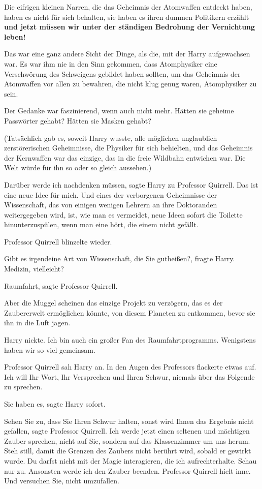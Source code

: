 Die eifrigen kleinen Narren, die das Geheimnis der Atomwaffen entdeckt haben,
haben es nicht für sich behalten, sie haben es ihren dummen Politikern erzählt
\textbf{und jetzt müssen wir unter der ständigen Bedrohung der Vernichtung
leben!}\grqq{}

Das war eine ganz andere Sicht der Dinge, als die, mit der Harry aufgewachsen
war. Es war ihm nie in den Sinn gekommen, dass Atomphysiker eine Verschwörung
des Schweigens gebildet haben sollten, um das Geheimnis der Atomwaffen vor allen
zu bewahren, die nicht klug genug waren, Atomphysiker zu sein.

Der Gedanke war faszinierend, wenn auch nicht mehr. Hätten sie geheime
Passwörter gehabt? Hätten sie Masken gehabt?

(Tatsächlich gab es, soweit Harry wusste, alle möglichen unglaublich
zerstörerischen Geheimnisse, die Physiker für sich behielten, und das Geheimnis
der Kernwaffen war das einzige, das in die freie Wildbahn entwichen war. Die
Welt würde für ihn so oder so gleich aussehen.)

\glqq{}Darüber werde ich nachdenken müssen\grqq{}, sagte Harry zu Professor
Quirrell. \glqq{}Das ist eine neue Idee für mich. Und eines der verborgenen
Geheimnisse der Wissenschaft, das von einigen wenigen Lehrern an ihre
Doktoranden weitergegeben wird, ist, wie man es vermeidet, neue Ideen sofort die
Toilette hinunterzuspülen, wenn man eine hört, die einem nicht gefällt.\grqq{}

Professor Quirrell blinzelte wieder.

\glqq{}Gibt es irgendeine Art von Wissenschaft, die Sie gutheißen?\grqq{}, fragte
Harry. \glqq{}Medizin, vielleicht?\grqq{}

\glqq{}Raumfahrt\grqq{}, sagte Professor Quirrell.

\glqq{}Aber die Muggel scheinen das einzige Projekt zu verzögern, das es der
Zaubererwelt ermöglichen könnte, von diesem Planeten zu entkommen, bevor sie ihn
in die Luft jagen.\grqq{}

Harry nickte. \glqq{}Ich bin auch ein großer Fan des Raumfahrtprogramms.
Wenigstens haben wir so viel gemeinsam.\grqq{}

Professor Quirrell sah Harry an. In den Augen des Professors flackerte etwas
auf. \glqq{}Ich will Ihr Wort, Ihr Versprechen und Ihren Schwur, niemals über das
Folgende zu sprechen.\grqq{}

\glqq{}Sie haben es\grqq{}, sagte Harry sofort.

\glqq{}Sehen Sie zu, dass Sie Ihren Schwur halten, sonst wird Ihnen das Ergebnis
nicht gefallen\grqq{}, sagte Professor Quirrell. \glqq{}Ich werde jetzt einen
seltenen und mächtigen Zauber sprechen, nicht auf Sie, sondern auf das
Klassenzimmer um uns herum. Steh still, damit die Grenzen des Zaubers nicht
berührt wird, sobald er gewirkt wurde. Du darfst nicht mit der Magie
interagieren, die ich aufrechterhalte. Schau nur zu. Ansonsten werde ich den
Zauber beenden.\grqq{} Professor Quirrell hielt inne. \glqq{}Und versuchen Sie,
nicht umzufallen.\grqq{}

